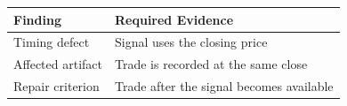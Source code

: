 \begin{tabular}{@{}P{4.0cm}P{8.5cm}@{}}
\toprule
\textbf{Finding} & \textbf{Required Evidence} \\
\midrule
Timing defect & Signal uses the closing price \\
Affected artifact & Trade is recorded at the same close \\
Repair criterion & Trade after the signal becomes available \\
\bottomrule
\end{tabular}
